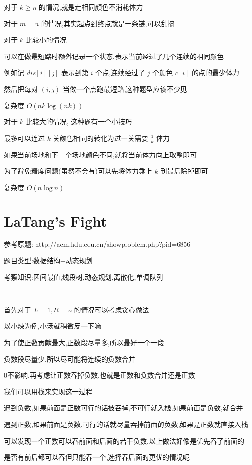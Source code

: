 \documentclass[UTF8]{ctexart}
\begin{document}
对于 $k\geq n$ 的情况,就是走相同颜色不消耗体力

对于 $m = n$ 的情况,其实起点到终点就是一条链,可以乱搞

对于 $k$ 比较小的情况

可以在做最短路时额外记录一个状态,表示当前经过了几个连续的相同颜色

例如记 $dis[i][j]$ 表示到第 $i$ 个点,连续经过了 $j$ 个颜色 $c[i]$ 的点的最少体力

然后把每对 $(i,j)$ 当做一个点跑最短路,这种题型应该不少见

复杂度 $O(nk\log(nk))$

对于 $k$ 比较大的情况, 这种题有一个小技巧

最多可以连过 $k$ 关颜色相同的转化为过一关需要 $\frac{1}{k}$ 体力

如果当前场地和下一个场地颜色不同,就将当前体力向上取整即可

为了避免精度问题(虽然不会有)可以先将体力乘上 $k$ 到最后除掉即可

复杂度 $O(n\log n)$

\newpage
\section{LaTang's Fight}

参考原题: http://acm.hdu.edu.cn/showproblem.php?pid=6856

题目类型:数据结构+动态规划

考察知识:区间最值,线段树,动态规划,离散化,单调队列

---------------------------------------------------

首先对于 $L=1,R=n$ 的情况可以考虑贪心做法

以小辣为例,小汤就稍微反一下嘛

为了使正数贡献最大,正数段尽量多,所以最好一个一段

负数段尽量少,所以尽可能将连续的负数合并

0不影响,再考虑让正数吞掉负数,也就是正数和负数合并还是正数

我们可以用栈来实现这一过程

遇到负数,如果前面是正数可行的话被吞掉,不可行就入栈,如果前面是负数,就合并

遇到正数,如果前面是负数,可行的话就尽量吞掉前面的负数,如果是正数就直接入栈

可以发现一个正数可以吞前面和后面的若干负数,以上做法好像是优先吞了前面的

是否有前后都可以吞但只能吞一个,选择吞后面的更优的情况呢
\end{document}
